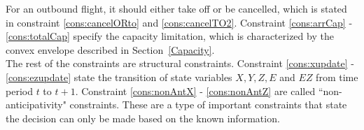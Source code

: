 \documentclass[12pt]{article}
\begin{document}
	\newline
	For an outbound flight, it should either take off or be cancelled, which is stated in constraint \eqref{cons:cancelORto} and \eqref{cons:cancelTO2}. Constraint \eqref{cons:arrCap} - \eqref{cons:totalCap} specify the capacity limitation, which is characterized by the convex envelope described in Section~\ref{Capacity}.\\
	\newline
	The rest of the constraints are structural constraints. Constraint \eqref{cons:xupdate} - \eqref{cons:ezupdate} state the transition of state variables \(X, Y, Z, E\) and \(EZ\) from time period \(t\) to \(t+1\). Constraint \eqref{cons:nonAntX} - \eqref{cons:nonAntZ} are called ``non-anticipativity" constraints. These are a type of important constraints that state the decision can only be made based on the known information.  
	
\end{document}
